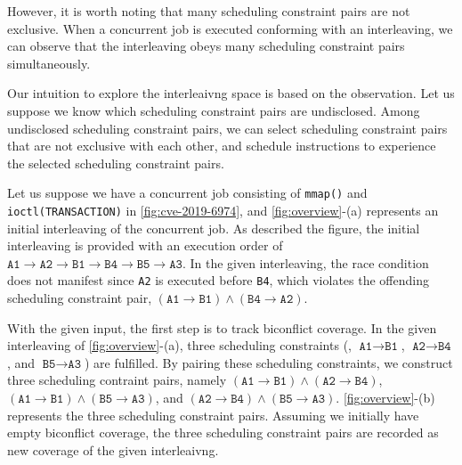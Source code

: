 However, it is worth noting that many scheduling constraint pairs are
not exclusive.
%
When a concurrent job is executed conforming with an interleaving, we
can observe that the interleaving obeys many scheduling constraint
pairs simultaneously.
%

Our intuition to explore the interleaivng space is based on the
observation.
%
Let us suppose we know which scheduling constraint pairs are
undisclosed. Among undisclosed scheduling constraint pairs, we can
select scheduling constraint pairs that are not exclusive with each
other, and schedule instructions to experience the selected
scheduling constraint pairs.
%


%
%
Let us suppose we have a concurrent job consisting of \texttt{mmap()}
and \texttt{ioctl(TRANSACTION)} in \autoref{fig:cve-2019-6974}, and
\autoref{fig:overview}-(a) represents an initial interleaving of the
concurrent job.
%
As described the figure, the initial interleaving is provided with an
execution order of
$\texttt{A1} \rightarrow \texttt{A2} \rightarrow \texttt{B1}
\rightarrow \texttt{B4} \rightarrow \texttt{B5} \rightarrow
\texttt{A3}$.
%
In the given interleaving, the race condition does not manifest since
\texttt{A2} is executed before \texttt{B4}, which violates the
offending scheduling constraint pair,
$(\texttt{A1} \rightarrow \texttt{B1}) \wedge (\texttt{B4} \rightarrow
\texttt{A2})$.

With the given input, the first step is to track biconflict coverage.
In the given interleaving of \autoref{fig:overview}-(a), three
scheduling constraints (\ie, $\texttt{A1} \rightarrow \texttt{B1}$,
$\texttt{A2} \rightarrow \texttt{B4}$, and
$\texttt{B5} \rightarrow \texttt{A3}$) are fulfilled.
%
By pairing these scheduling constraints, we construct three scheduling
contraint pairs, namely
$(\texttt{A1} \rightarrow \texttt{B1}) \wedge (\texttt{A2} \rightarrow
\texttt{B4})$,
$(\texttt{A1} \rightarrow \texttt{B1}) \wedge (\texttt{B5} \rightarrow
\texttt{A3})$, and
$(\texttt{A2} \rightarrow \texttt{B4}) \wedge (\texttt{B5} \rightarrow
\texttt{A3})$.
%
\autoref{fig:overview}-(b) represents the three scheduling constraint
pairs.
%
Assuming we initially have empty biconflict coverage, the three
scheduling constraint pairs are recorded as new coverage of the given
interleaivng.



